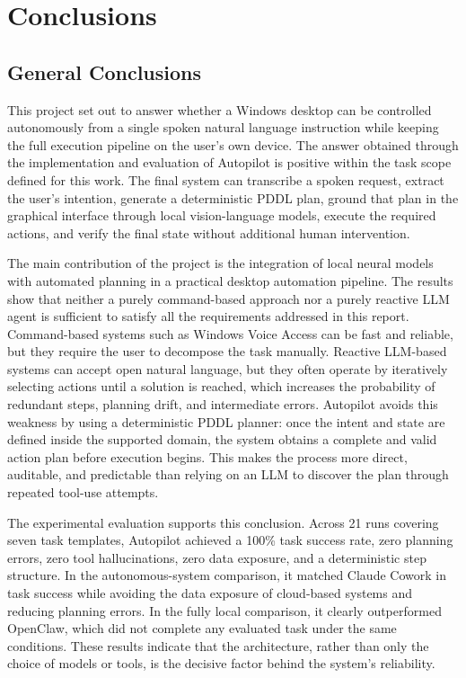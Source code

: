 \chapter{Conclusions}
\setcounter{section}{0}

\section{General Conclusions}

This project set out to answer whether a Windows desktop can be controlled autonomously from a single spoken natural language instruction while keeping the full execution pipeline on the user's own device. The answer obtained through the implementation and evaluation of Autopilot is positive within the task scope defined for this work. The final system can transcribe a spoken request, extract the user's intention, generate a deterministic PDDL plan, ground that plan in the graphical interface through local vision-language models, execute the required actions, and verify the final state without additional human intervention.

The main contribution of the project is the integration of local neural models with automated planning in a practical desktop automation pipeline. The results show that neither a purely command-based approach nor a purely reactive LLM agent is sufficient to satisfy all the requirements addressed in this report. Command-based systems such as Windows Voice Access can be fast and reliable, but they require the user to decompose the task manually. Reactive LLM-based systems can accept open natural language, but they often operate by iteratively selecting actions until a solution is reached, which increases the probability of redundant steps, planning drift, and intermediate errors. Autopilot avoids this weakness by using a deterministic PDDL planner: once the intent and state are defined inside the supported domain, the system obtains a complete and valid action plan before execution begins. This makes the process more direct, auditable, and predictable than relying on an LLM to discover the plan through repeated tool-use attempts.

The experimental evaluation supports this conclusion. Across 21 runs covering seven task templates, Autopilot achieved a 100\% task success rate, zero planning errors, zero tool hallucinations, zero data exposure, and a deterministic step structure. In the autonomous-system comparison, it matched Claude Cowork in task success while avoiding the data exposure of cloud-based systems and reducing planning errors. In the fully local comparison, it clearly outperformed OpenClaw, which did not complete any evaluated task under the same conditions. These results indicate that the architecture, rather than only the choice of models or tools, is the decisive factor behind the system's reliability.

